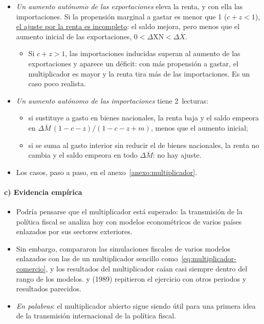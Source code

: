 \documentclass[11pt]{article}
\begin{document}
\begin{itemize}
\item \emph{Un aumento autónomo de las exportaciones} eleva la renta, y con ella las importaciones. Si la propensión marginal a gastar es menor que 1 ($c+z<1$), \uline{el ajuste por la renta es incompleto}: el saldo mejora, pero menos que el aumento inicial de las exportaciones, $0<\Delta\mathrm{XN}<\Delta\overline X$.
  \begin{itemize}
  \item Si $c+z>1$, las importaciones inducidas superan al aumento de las exportaciones y aparece un déficit: con más propensión a gastar, el multiplicador es mayor y la renta tira más de las importaciones. Es un caso poco realista.
  \end{itemize}
\item \emph{Un aumento autónomo de las importaciones} tiene 2~lecturas:
  \begin{itemize}
  \item si sustituye a gasto en bienes nacionales, la renta baja y el saldo empeora en $\Delta\overline M\,(1-c-z)/(1-c-z+m)$, menos que el aumento inicial;
  \item si se suma al gasto interior sin reducir el de bienes nacionales, la renta no cambia y el saldo empeora en todo $\Delta\overline M$: no hay ajuste.
  \end{itemize}
\item Los casos, paso a paso, en el anexo~\ref{anexo:multiplicador}.
\end{itemize}

\paragraph{c) Evidencia empírica}

\begin{itemize}
\item Podría pensarse que el multiplicador está superado: la transmisión de la política fiscal se analiza hoy con modelos econométricos de varios países enlazados por sus sectores exteriores.
\item Sin embargo, \textcite{DeardorffStern1979Linked} compararon las simulaciones fiscales de varios modelos enlazados con las de un multiplicador sencillo como~\eqref{eq:multiplicador-comercio}, y los resultados del multiplicador caían casi siempre dentro del rango de los modelos.  y  (1989) repitieron el ejercicio con otros periodos y resultados parecidos\nocite{Gandolfo2016International}.
\item \emph{En palabras}: el multiplicador abierto sigue siendo útil para una primera idea de la transmisión internacional de la política fiscal.
\end{itemize}
\end{document}
